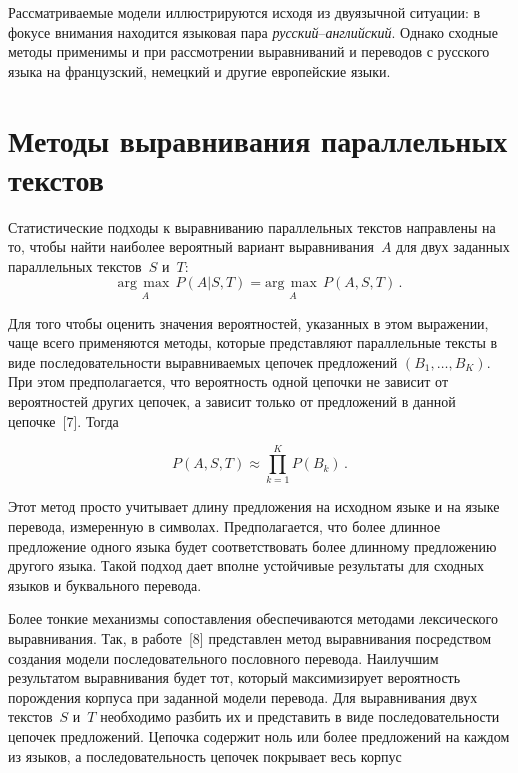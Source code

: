 \begin{multicols}{2}
     Рассматриваемые модели иллюстрируются исходя из двуязычной 
ситуации: в фокусе внимания находится языковая пара 
     \textit{русский}--\textit{английский}. Однако сходные методы 
применимы и при рассмотрении выравниваний и переводов с русского языка 
на французский, немецкий и другие европейские языки. 

\section{Методы выравнивания параллельных текстов}
  
     Статистические подходы к выравниванию параллельных текстов 
направлены на то, чтобы найти наиболее вероятный вариант 
выравнивания~$A$ для двух заданных параллельных текстов~$S$ и~$T$:
     \begin{equation*}
     \underset{A}{\mathrm{arg}\,\max}\,P\left(A\vert S,T\right) 
=\underset{A}{\mathrm{arg}\,\max}\,P \left( A,S,T\right)\,.
     \end{equation*}
     
     Для того чтобы оценить значения вероятностей, указанных в этом 
выражении, чаще всего применяются методы, которые представляют 
параллельные тексты в виде последовательности выравниваемых цепочек 
предложений $(B _1,\ldots ,B_K)$. При этом предполагается, что 
вероятность одной цепочки не зависит от вероятностей других цепочек, а 
зависит только от предложений в данной цепочке~[7]. Тогда

\noindent
     \begin{equation*}
     P(A,S,T)\approx \prod\limits_{k=1}^K P(B_k)\,.
     \end{equation*}
     
     Этот метод просто учитывает длину предложения на исходном языке и 
на языке перевода, измеренную в символах. Предполагается, что более 
длинное предложение одного языка будет соответствовать более длинному 
предложению другого языка. Такой подход дает вполне устойчивые 
результаты для сходных языков и буквального перевода.
     
     Более тонкие механизмы сопоставления обеспечиваются методами 
лексического выравнивания. Так, в работе~[8] представлен метод 
выравнивания посредством создания модели последовательного пословного 
перевода. Наилучшим результатом выравнивания будет тот, который 
максимизирует вероятность порождения корпуса при заданной модели 
перевода. Для выравнивания двух текстов~$S$ и~$T$ необходимо разбить их 
и представить в виде последовательности цепочек предложений. Цепочка 
содержит ноль или более предложений на каждом из языков, а 
последовательность цепочек покрывает весь корпус


\end{multicols}
